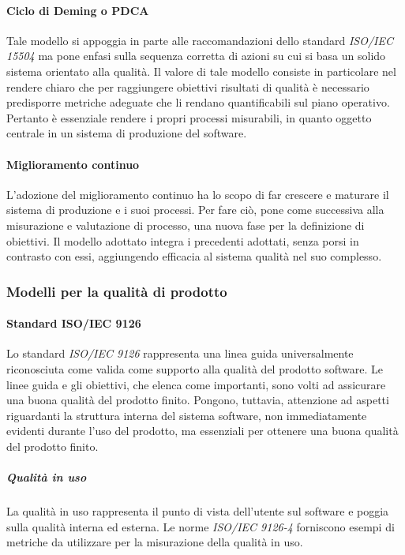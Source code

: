 \documentclass[12pt,a4paper]{article}
\begin{document}
	\paragraph{Ciclo di Deming o PDCA}
	Tale modello si appoggia in parte alle raccomandazioni dello standard \textit{ISO/IEC 15504} ma pone enfasi sulla sequenza corretta di azioni su cui si basa un solido sistema orientato alla qualità. Il valore di tale modello consiste in particolare nel rendere chiaro che per raggiungere obiettivi risultati di qualità è necessario predisporre metriche adeguate che li rendano quantificabili sul piano operativo. Pertanto è essenziale rendere i propri processi misurabili, in quanto oggetto centrale in un sistema di produzione del software.
	
	\paragraph{Miglioramento continuo}
	L'adozione del miglioramento continuo ha lo scopo di far crescere e maturare il sistema di produzione e i suoi processi. Per fare ciò, pone come successiva alla misurazione e valutazione di processo, una nuova fase per la definizione di obiettivi. Il modello adottato integra i precedenti adottati, senza porsi in contrasto con essi, aggiungendo efficacia al sistema qualità nel suo complesso.
	
	\subsubsection{Modelli per la qualità di prodotto}
	
	\paragraph{Standard ISO/IEC 9126}
	Lo standard \textit{ISO/IEC 9126} rappresenta una linea guida universalmente riconosciuta come valida come supporto alla qualità del prodotto software. Le linee guida e gli obiettivi, che elenca come importanti, sono volti ad assicurare una buona qualità del prodotto finito. Pongono, tuttavia, attenzione ad aspetti riguardanti la struttura interna del sistema software, non immediatamente evidenti durante l'uso del prodotto, ma essenziali per ottenere una buona qualità del prodotto finito.
	
	\subparagraph{Qualità in uso}
	La qualità in uso rappresenta il punto di vista dell'utente sul software e poggia sulla qualità interna ed esterna. Le norme \textit{ISO/IEC 9126-4} forniscono esempi di metriche da utilizzare per la misurazione della qualità in uso.
	
\end{document}
